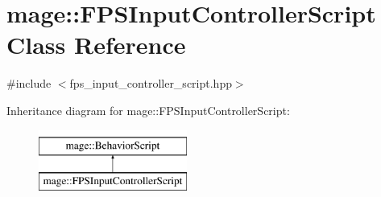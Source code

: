 \hypertarget{classmage_1_1_f_p_s_input_controller_script}{}\section{mage\+:\+:F\+P\+S\+Input\+Controller\+Script Class Reference}
\label{classmage_1_1_f_p_s_input_controller_script}


{\ttfamily \#include $<$fps\+\_\+input\+\_\+controller\+\_\+script.\+hpp$>$}

Inheritance diagram for mage\+:\+:F\+P\+S\+Input\+Controller\+Script\+:\begin{figure}[H]
\begin{center}
\leavevmode
\includegraphics[height=2.000000cm]{classmage_1_1_f_p_s_input_controller_script}
\end{center}
\end{figure}
